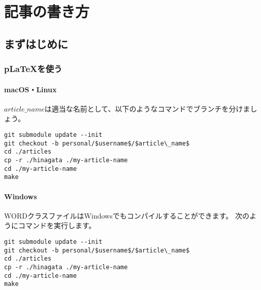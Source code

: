 \usepackage{listings}
\lstset{
  basicstyle=\ttfamily,
  commentstyle=\textit,
  frame=trBL,
  numbers=left,
  breaklines=true,
  title=\lstname,
}
\usepackage{fancybox}
\usepackage{url}
\usepackage{hyperref}
\ifluatex
\else
  \usepackage{pxjahyper}
\fi

\subtitle{ヘッダの見出し}


\author{ほげ}



\chapter{記事の書き方}

\section{まずはじめに}

\subsection{p\LaTeX を使う}

\subsubsection{macOS・Linux}

$article\_name$は適当な名前として、以下のようなコマンドでブランチを分けましょう。

\begin{lstlisting}[mathescape]
git submodule update --init
git checkout -b personal/$username$/$article\_name$
cd ./articles
cp -r ./hinagata ./my-article-name
cd ./my-article-name
make
\end{lstlisting}

\subsubsection{Windows}

WORDクラスファイルはWindowsでもコンパイルすることができます。
次のようにコマンドを実行します。

\begin{lstlisting}[mathescape]
git submodule update --init
git checkout -b personal/$username$/$article\_name$
cd ./articles
cp -r ./hinagata ./my-article-name
cd ./my-article-name
make
\end{lstlisting}

